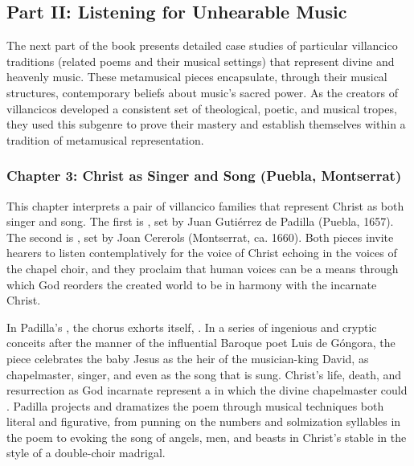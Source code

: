 \documentclass{vcbook-proposal}
\begin{document}
\subsection{Part II: Listening for Unhearable Music}

The next part of the book presents detailed case studies of particular 
villancico traditions (related poems and their musical settings) that represent 
divine and heavenly music.
These metamusical pieces encapsulate, through their musical structures, 
contemporary beliefs about music's sacred power.
As the creators of villancicos developed a consistent set of theological, 
poetic, and musical tropes, they used this subgenre to prove their mastery and 
establish themselves within a tradition of metamusical representation.

\subsubsection{Chapter 3: Christ as Singer and Song (Puebla, Montserrat)}

This chapter interprets a pair of villancico families that represent Christ as
both singer and song.
The first is , set by Juan Gutiérrez de
Padilla (Puebla, 1657).
The second is , set by Joan 
Cererols (Montserrat, ca. 1660).
Both pieces invite hearers to listen contemplatively for the voice of Christ
echoing in the voices of the chapel choir, and they proclaim that human voices
can be a means through which God reorders the created world to be in harmony
with the incarnate Christ.

In Padilla's , the chorus exhorts itself, .
In a series of ingenious and cryptic conceits after the manner of the
influential Baroque poet Luis de Góngora, the piece celebrates the baby Jesus as
the heir of the musician-king David, as chapelmaster, singer, and even as the
song that is sung.
Christ's life, death, and resurrection as God incarnate represent a 
 in which the divine chapelmaster could .
Padilla projects and dramatizes the poem through musical techniques both literal
and figurative, from punning on the numbers and solmization syllables in the
poem to evoking the song of angels, men, and beasts in Christ's stable in the
style of a double-choir madrigal.
\end{document}
